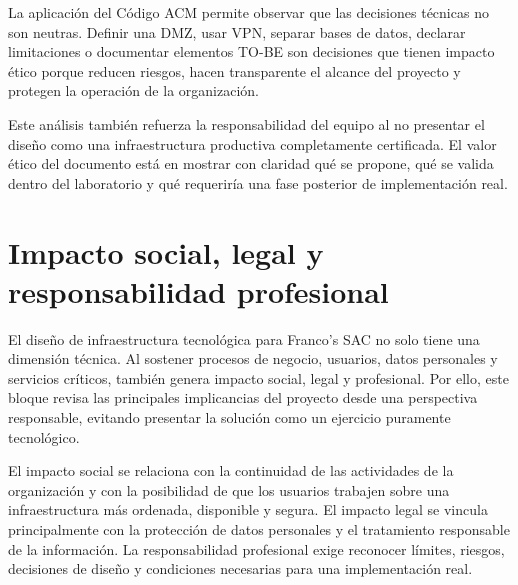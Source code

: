 \documentclass[11pt, a4paper, oneside]{report}
\begin{document}
La aplicación del Código ACM permite observar que las decisiones técnicas no son neutras. Definir una DMZ, usar VPN, separar bases de datos, declarar limitaciones o documentar elementos TO-BE son decisiones que tienen impacto ético porque reducen riesgos, hacen transparente el alcance del proyecto y protegen la operación de la organización.

Este análisis también refuerza la responsabilidad del equipo al no presentar el diseño como una infraestructura productiva completamente certificada. El valor ético del documento está en mostrar con claridad qué se propone, qué se valida dentro del laboratorio y qué requeriría una fase posterior de implementación real.

\section{Impacto social, legal y responsabilidad profesional}

El diseño de infraestructura tecnológica para Franco's SAC no solo tiene una dimensión técnica. Al sostener procesos de negocio, usuarios, datos personales y servicios críticos, también genera impacto social, legal y profesional. Por ello, este bloque revisa las principales implicancias del proyecto desde una perspectiva responsable, evitando presentar la solución como un ejercicio puramente tecnológico.

El impacto social se relaciona con la continuidad de las actividades de la organización y con la posibilidad de que los usuarios trabajen sobre una infraestructura más ordenada, disponible y segura. El impacto legal se vincula principalmente con la protección de datos personales y el tratamiento responsable de la información. La responsabilidad profesional exige reconocer límites, riesgos, decisiones de diseño y condiciones necesarias para una implementación real.

\renewcommand{\arraystretch}{1.3}
\footnotesize
{}
\end{document}

